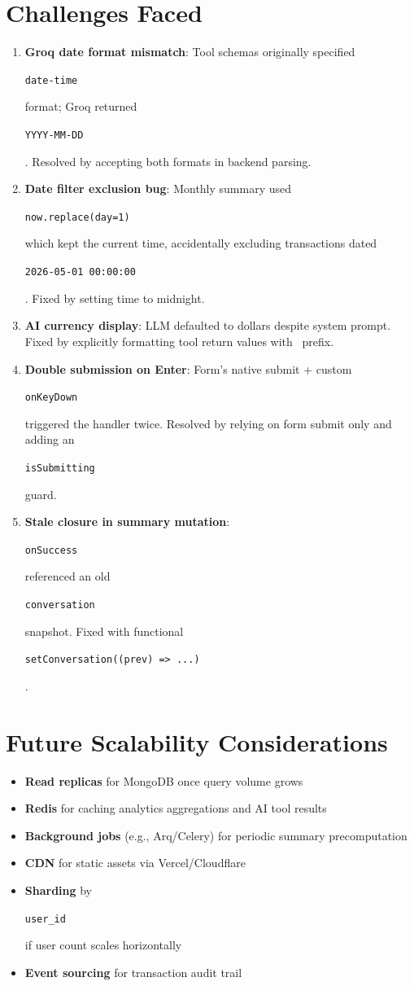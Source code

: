 \documentclass[11pt,a4paper]{article}
\newcommand{\code}[1]{\colorbox{codebg}{\strut\texttt{\small #1}}}
\begin{document}
\section{Challenges Faced}

\begin{enumerate}[leftmargin=*,itemsep=3pt]
  \item \textbf{Groq date format mismatch}: Tool schemas originally specified \code{date-time} format; Groq returned \code{YYYY-MM-DD}. Resolved by accepting both formats in backend parsing.
  \item \textbf{Date filter exclusion bug}: Monthly summary used \code{now.replace(day=1)} which kept the current time, accidentally excluding transactions dated \code{2026-05-01 00:00:00}. Fixed by setting time to midnight.
  \item \textbf{AI currency display}: LLM defaulted to dollars despite system prompt. Fixed by explicitly formatting tool return values with \rupee\ prefix.
  \item \textbf{Double submission on Enter}: Form's native submit + custom \code{onKeyDown} triggered the handler twice. Resolved by relying on form submit only and adding an \code{isSubmitting} guard.
  \item \textbf{Stale closure in summary mutation}: \code{onSuccess} referenced an old \code{conversation} snapshot. Fixed with functional \code{setConversation((prev) => ...)}.
\end{enumerate}

\section{Future Scalability Considerations}

\begin{itemize}[leftmargin=*,itemsep=2pt]
  \item \textbf{Read replicas} for MongoDB once query volume grows
  \item \textbf{Redis} for caching analytics aggregations and AI tool results
  \item \textbf{Background jobs} (e.g., Arq/Celery) for periodic summary precomputation
  \item \textbf{CDN} for static assets via Vercel/Cloudflare
  \item \textbf{Sharding} by \code{user\_id} if user count scales horizontally
  \item \textbf{Event sourcing} for transaction audit trail
\end{itemize}
\end{document}
